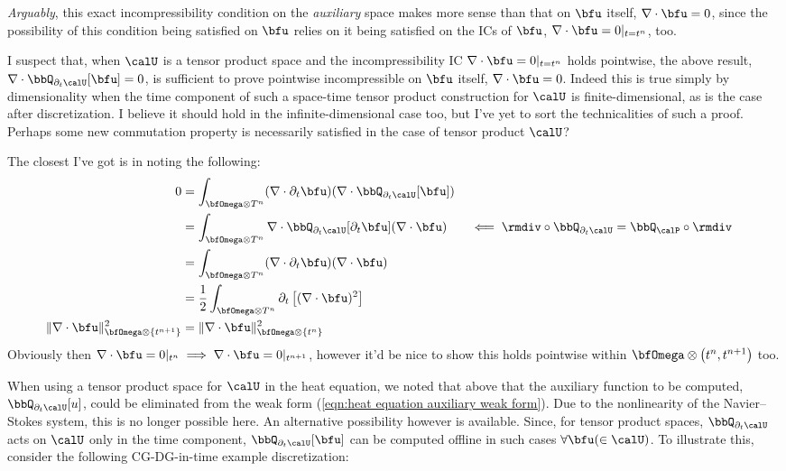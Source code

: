     \begin{remark}
        \emph{Arguably}, this exact incompressibility condition on the \emph{auxiliary} space makes more sense than that on $\bfu$ itself, $\nabla\cdot\bfu = 0$, since the possibility of this condition being satisfied on $\bfu$ relies on it being satisfied on the ICs of $\bfu$, $\nabla\cdot\bfu = 0|_{t = t^{n}}$, too.
        
        I suspect that, when $\calU$ is a tensor product space and the incompressibility IC $\nabla\cdot\bfu  =  0|_{t = t^{n}}$ holds pointwise, the above result, $\nabla\cdot\bbQ_{\partial_{t}\calU}[\bfu]  =  0$, is sufficient to prove pointwise incompressible on $\bfu$ itself, $\nabla\cdot\bfu = 0$. Indeed this is true simply by dimensionality when the time component of such a space-time tensor product construction for $\calU$ is finite-dimensional, as is the case after discretization. I believe it should hold in the infinite-dimensional case too, but I've yet to sort the technicalities of such a proof. Perhaps some new commutation property is necessarily satisfied in the case of tensor product $\calU$?

        The closest I've got is in noting the following:
        \begin{align}
            0  &=  \int_{\bfOmega\otimes T^{n}}(\nabla\cdot\partial_{t}\bfu)(\nabla\cdot\bbQ_{\partial_{t}\calU}[\bfu])  \\
            &=  \int_{\bfOmega\otimes T^{n}}\nabla\cdot\bbQ_{\partial_{t}\calU}[\partial_{t}\bfu](\nabla\cdot\bfu)  &&\impliedby  \rmdiv\circ\bbQ_{\partial_{t}\calU} = \bbQ_{\calP}\circ\rmdiv  \\
            &=  \int_{\bfOmega\otimes T^{n}}(\nabla\cdot\partial_{t}\bfu)(\nabla\cdot\bfu)  \\
            &=  \frac{1}{2}\int_{\bfOmega\otimes T^{n}}\partial_{t}\left[(\nabla\cdot\bfu)^{2}\right]  \\
            \|\nabla\cdot\bfu\|_{\bfOmega\otimes\left\{t^{n + 1}\right\}}^{2}  &=  
            \|\nabla\cdot\bfu\|_{\bfOmega\otimes\left\{t^{n}\right\}}^{2}
        \end{align}
        Obviously then $\nabla\cdot\bfu  =  0|_{t^{n}}  \implies  \nabla\cdot\bfu  =  0|_{t^{n + 1}}$, however it'd be nice to show this holds pointwise within $\bfOmega\otimes\left(t^{n}, t^{n + 1}\right)$ too.
    \end{remark}

    When using a tensor product space for $\calU$ in the heat equation, we noted that above that the auxiliary function to be computed, $\bbQ_{\partial_{t}\calU}[u]$, could be eliminated from the weak form (\ref{eqn:heat equation auxiliary weak form}). Due to the nonlinearity of the Navier--Stokes system, this is no longer possible here. An alternative possibility however is available. Since, for tensor product spaces, $\bbQ_{\partial_{t}\calU}$ acts on $\calU$ only in the time component, $\bbQ_{\partial_{t}\calU}[\bfu]$ can be computed offline in such cases $\forall \bfu (\in \calU)$. To illustrate this, consider the following CG-DG-in-time example discretization:
    
